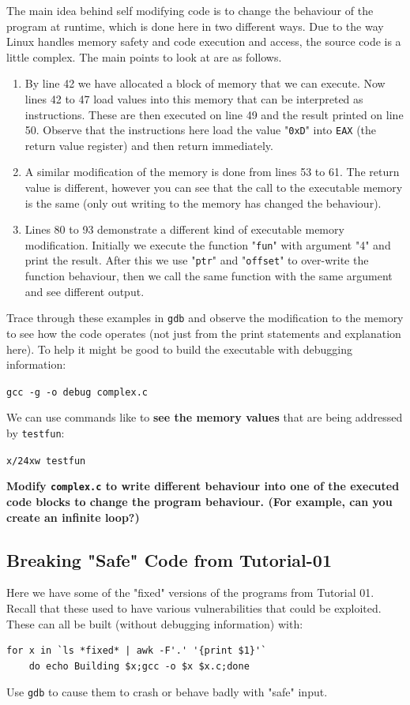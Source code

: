 \documentclass{article}
\begin{document}
\noindent The main idea behind self modifying code is to change the behaviour of
the program at runtime, which is done here in two different ways. Due to the
way Linux handles memory safety and code execution and access, the source
code is a little complex. The main points to look at are as follows.
\begin{enumerate}
    \item By line 42 we have allocated a block of memory that we can execute. Now lines 42 to 47 load values into this memory that can be interpreted as instructions. These are then executed on line 49 and the result printed on line 50. Observe that the instructions here load the value "\lstinline{0xD}" into \lstinline{EAX} (the return value register) and then return immediately.
    \item A similar modification of the memory is done from lines 53 to 61. The return value is different, however you can see that the call to the executable memory is the same (only out writing to the memory has changed the behaviour).
    \item Lines 80 to 93 demonstrate a different kind of executable memory modification. Initially we execute the function "\lstinline{fun}" with argument "4" and print the result. After this we use "\lstinline{ptr}" and "\lstinline{offset}" to over-write the function behaviour, then we call the same function with the same argument and see different output.
\end{enumerate}
\noindent Trace through these examples in \lstinline{gdb} and observe the modification to the
memory to see how the code operates (not just from the print statements
and explanation here). To help it might be good to build the executable with
debugging information:
\begin{center}
    \lstinline{gcc -g -o debug complex.c}
\end{center}
\noindent We can use commands like to \textbf{see the memory values} that are being addressed by \lstinline{testfun}:
\begin{center}
    \lstinline{x/24xw testfun}
\end{center}
\textbf{Modify \lstinline{complex.c} to write different behaviour into one of
the executed code blocks to change the program behaviour. (For example,
can you create an infinite loop?)}
\subsection{Breaking "Safe" Code from Tutorial-01}
Here we have some of the "fixed" versions of the programs from Tutorial 01.
Recall that these used to have various vulnerabilities that could be exploited.
These can all be built (without debugging information) with:
\begin{lstlisting}[mathescape=false]
for x in `ls *fixed* | awk -F'.' '{print $1}'`
    do echo Building $x;gcc -o $x $x.c;done
\end{lstlisting}
\noindent Use \lstinline{gdb} to cause them to crash or behave badly with "safe" input.\\
\end{document}
